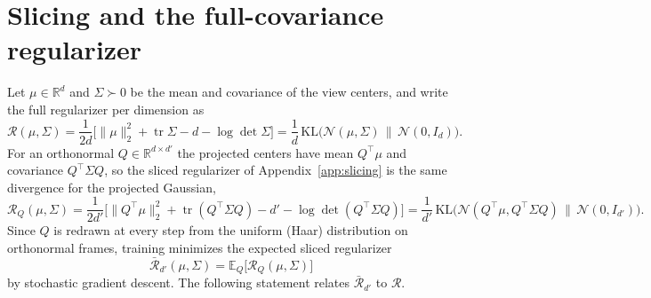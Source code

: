 \section{Slicing and the full-covariance regularizer}
\label{app:slicing-theory}

Let $\mu\in\mathbb R^d$ and $\Sigma\succ0$ be the mean and covariance of the view centers, and write the full regularizer per dimension as
\[
\mathcal R(\mu,\Sigma)
=\frac{1}{2d}\Big[\|\mu\|_2^2+\operatorname{tr}\Sigma-d-\log\det\Sigma\Big]
=\frac{1}{d}\,\mathrm{KL}\big(\mathcal N(\mu,\Sigma)\,\|\,\mathcal N(0,I_d)\big).
\]
For an orthonormal $Q\in\mathbb R^{d\times d'}$ the projected centers have mean $Q^\top\mu$ and covariance $Q^\top\Sigma Q$, so the sliced regularizer of Appendix~\ref{app:slicing} is the same divergence for the projected Gaussian,
\[
\mathcal R_Q(\mu,\Sigma)
=\frac{1}{2d'}\Big[\|Q^\top\mu\|_2^2+\operatorname{tr}(Q^\top\Sigma Q)-d'-\log\det(Q^\top\Sigma Q)\Big]
=\frac{1}{d'}\,\mathrm{KL}\big(\mathcal N(Q^\top\mu,Q^\top\Sigma Q)\,\|\,\mathcal N(0,I_{d'})\big).
\]
Since $Q$ is redrawn at every step from the uniform (Haar) distribution on orthonormal frames, training minimizes the expected sliced regularizer
\[
\bar{\mathcal R}_{d'}(\mu,\Sigma)=\mathbb E_Q\big[\mathcal R_Q(\mu,\Sigma)\big]
\]
by stochastic gradient descent. The following statement relates $\bar{\mathcal R}_{d'}$ to $\mathcal R$.

